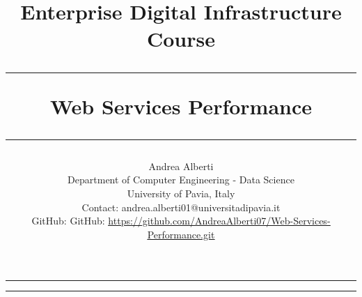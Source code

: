 \documentclass[a4paper,10pt]{article}
\title{\Large {Enterprise Digital Infrastructure Course} \vspace{0.2cm}
     \rule{\textwidth}{0.3pt} \vspace{0.0cm} %
     \textbf{Web Services Performance} \vspace{0.0cm} %
     \rule{\textwidth}{0.3pt}}
\author{Andrea Alberti \vspace{0.1cm}\\
        \small Department of Computer Engineering - Data Science \vspace{0.2cm}\\
        \small University of Pavia, Italy \vspace{0.2cm}\\
        \small Contact: andrea.alberti01@universitadipavia.it\\
        \small GitHub: \small GitHub: \href{https://github.com/AndreaAlberti07/Web-Services-Performance.git}{\underline{https://github.com/AndreaAlberti07/Web-Services-Performance.git}}\vspace{0.5cm}}
\begin{document}

\begin{titlepage}
        \maketitle 
        \thispagestyle{empty} 
\begin{multicols*}{2}

\hrule
\tableofcontents
\newcolumn
\hrule
\begin{abstract}
        \noindent
        
\end{abstract}


        
\end{multicols*}
\end{titlepage}


\newpage
\listoffigures
\listoftables
\end{document}
